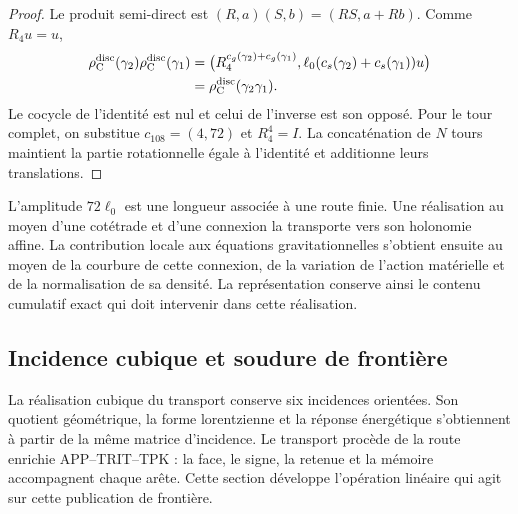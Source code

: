 \begin{proof}
Le produit semi-direct est
\((R,a)(S,b)=(RS,a+Rb)\). Comme \(R_4u=u\),
\[
\begin{split}
 \rho_{\rm C}^{\rm disc}(\gamma_2)
 \rho_{\rm C}^{\rm disc}(\gamma_1)
 &=
 \bigl(R_4^{c_g(\gamma_2)+c_g(\gamma_1)},
 \ell_0(c_s(\gamma_2)+c_s(\gamma_1))u\bigr)\\
 &=\rho_{\rm C}^{\rm disc}(\gamma_2\gamma_1).
\end{split}
\]
Le cocycle de l'identité est nul et celui de l'inverse est son opposé.
Pour le tour complet, on substitue \(c_{108}=(4,72)\) et
\(R_4^4=I\). La concaténation de \(N\) tours maintient la partie
rotationnelle égale à l'identité et additionne leurs translations.
\end{proof}

L'amplitude \(72\ell_0\) est une longueur associée à une route finie. Une réalisation au moyen d'une cotétrade et d'une connexion la transporte vers son holonomie affine. La contribution locale aux équations gravitationnelles s'obtient ensuite au moyen de la courbure de cette connexion, de la variation de l'action matérielle et de la normalisation de sa densité. La représentation conserve ainsi le contenu cumulatif exact qui doit intervenir dans cette réalisation.




\subsection{Incidence cubique et soudure de frontière}
\label{ii:vii:sec:pantalla-respuesta}

La réalisation cubique du transport conserve six incidences orientées.
Son quotient géométrique, la forme lorentzienne et la réponse énergétique
s'obtiennent à partir de la même matrice d'incidence. Le transport procède de
la route enrichie APP--TRIT--TPK : la face, le signe, la retenue et la
mémoire accompagnent chaque arête. Cette section développe
l'opération linéaire qui agit sur cette publication de frontière.

